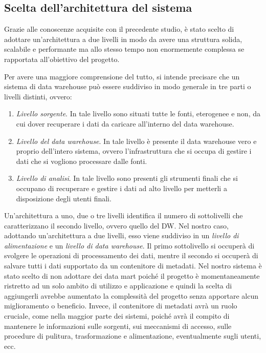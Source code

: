 \subsection{Scelta dell'architettura del sistema}

Grazie alle conoscenze acquisite con il precedente studio, è stato scelto di adottare un'architettura a due livelli in modo da avere una struttura solida, scalabile e performante ma allo stesso tempo non enormemente complessa se rapportata all'obiettivo del progetto.

Per avere una maggiore comprensione del tutto, si intende precisare che un sistema di data warehouse può essere suddiviso in modo generale in tre parti o livelli distinti, ovvero:

\begin{enumerate}
    \item \textit{Livello sorgente}. In tale livello sono situati tutte le fonti, eterogenee e non, da cui dover recuperare i dati da caricare all'interno del data warehouse.
    \item \textit{Livello del data warehouse}. In tale livello è presente il data warehouse vero e proprio dell'intero sistema, ovvero l'infrastruttura che si occupa di gestire i dati che si vogliono processare dalle fonti.
    \item \textit{Livello di analisi}. In tale livello sono presenti gli strumenti finali che si occupano di recuperare e gestire i dati ad alto livello per metterli a disposizione degli utenti finali.
\end{enumerate}

Un'architettura a uno, due o tre livelli identifica il numero di sottolivelli che caratterizzano il secondo livello, ovvero quello del DW. Nel nostro caso, adottando un'architettura a due livelli, esso viene suddiviso in un \textit{livello di alimentazione} e un \textit{livello di data warehouse}. Il primo sottolivello si occuperà di svolgere le operazioni di processamento dei dati, mentre il secondo si occuperà di salvare tutti i dati supportato da un contenitore di metadati. Nel nostro sistema è stato scelto di non adottare dei data mart poiché il progetto è momentaneamente ristretto ad un solo ambito di utilizzo e applicazione e quindi la scelta di aggiungerli avrebbe aumentato la complessità del progetto senza apportare alcun miglioramento o beneficio. Invece, il contenitore di metadati avrà un ruolo cruciale, come nella maggior parte dei sistemi, poiché avrà il compito di mantenere le informazioni sulle sorgenti, sui meccanismi di accesso, sulle procedure di pulitura, trasformazione e alimentazione, eventualmente sugli utenti, ecc.

